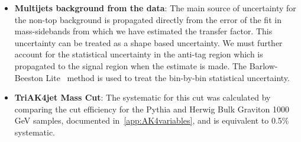 \begin{itemize}
\item \textbf{Multijets background from the data}: %
The main source of uncertainty for the non-top background is propagated directly from the error of the fit in mass-sidebands from which we have estimated the transfer factor. This uncertainty can be treated as a shape based uncertainty. 
We must further account for the statistical uncertainty in the anti-tag region which is propagated to the signal region when the estimate is made. 
The Barlow-Beeston Lite~\cite{BBLite} method is used to treat the bin-by-bin statistical uncertainty. 

\item \textbf{TriAK4jet Mass Cut}: The systematic for this cut was calculated by comparing the cut efficiency for the Pythia and Herwig Bulk Graviton 1000 GeV samples, documented in~\ref{app:AK4variables}, and is equivalent to 0.5\% systematic. 




\end{itemize}
